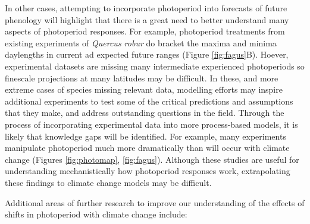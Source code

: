 \documentclass{article}
\begin{document}
\par In other cases, attempting to incorporate photoperiod into forecasts of future phenology will highlight that there is a great need to better understand many aspects of photoperiod responses. For example, photoperiod treatments from  existing experiments of \emph{Quercus robur} do bracket the maxima and minima daylengths in current ad expected future ranges (Figure \ref{fig:fagus}B). Hoever, experimental datasets are missing many intermediate experienced photoperiods so finescale projections at many latitudes may be difficult. In these, and more extreme cases of species missing relevant data, modelling efforts may inspire additional experiments to test some of the critical predictions and assumptions that they make, and address outstanding questions in the field. Through the process of incorporating experimental data into more process-based models, it is likely that knowledge gaps will be identified. For example, many experiments manipulate photoperiod much more dramatically than will occur with climate change (Figures \ref{fig:photomap}, \ref{fig:fagus}). Although these studies are useful for understanding mechanistically how photoperiod responses work, extrapolating these findings to climate change models may be difficult. 
\par Additional areas of further research to improve our understanding of the effects of shifts in photoperiod with climate change include:
\end{document}
